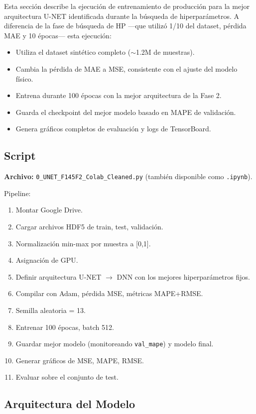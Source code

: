 \documentclass{article}
\begin{document}
Esta sección describe la ejecución de entrenamiento de producción para la mejor arquitectura U-NET identificada durante la búsqueda de hiperparámetros. A diferencia de la fase de búsqueda de HP —que utilizó 1/10 del dataset, pérdida MAE y 10 épocas— esta ejecución:
\begin{itemize}
\item Utiliza el dataset sintético completo ($\sim$1.2M de muestras).
\item Cambia la pérdida de MAE a MSE, consistente con el ajuste del modelo físico.
\item Entrena durante 100 épocas con la mejor arquitectura de la Fase 2.
\item Guarda el checkpoint del mejor modelo basado en MAPE de validación.
\item Genera gráficos completos de evaluación y logs de TensorBoard.
\end{itemize}

\subsection{Script}
\textbf{Archivo:} \texttt{0\_UNET\_F145F2\_Colab\_Cleaned.py} (también disponible como \texttt{.ipynb}).

Pipeline:
\begin{enumerate}
\item Montar Google Drive.
\item Cargar archivos HDF5 de train, test, validación.
\item Normalización min-max por muestra a [0,1].
\item Asignación de GPU.
\item Definir arquitectura U-NET $\rightarrow$ DNN con los mejores hiperparámetros fijos.
\item Compilar con Adam, pérdida MSE, métricas MAPE+RMSE.
\item Semilla aleatoria = 13.
\item Entrenar 100 épocas, batch 512.
\item Guardar mejor modelo (monitoreando \texttt{val\_mape}) y modelo final.
\item Generar gráficos de MSE, MAPE, RMSE.
\item Evaluar sobre el conjunto de test.
\end{enumerate}

\subsection{Arquitectura del Modelo}
\end{document}
